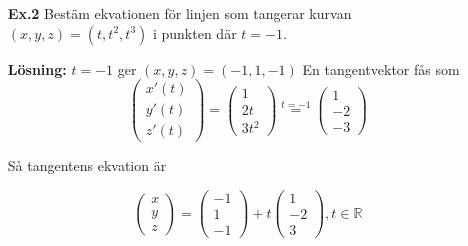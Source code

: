 \documentclass[a4paper,12pt]{article}
\begin{document}
\begin{itemize}
\item[\textbf{Ex.2}]
  Bestäm ekvationen för linjen som tangerar kurvan $(x,y,z) = (t, t^2, t^3)$ i
  punkten där $t = -1$.

  \textbf{Lösning:} $t = -1$ ger $(x,y,z) = (-1,1,-1)$ En tangentvektor fås som
  \begin{equation*}
    \begin{pmatrix}
      x'(t)\\
      y'(t)\\
      z'(t)
    \end{pmatrix}
    =
    \begin{pmatrix}
      1 \\
      2t \\
      3t^2
    \end{pmatrix}
    \stackrel{t = -1}{=}
    \begin{pmatrix}
      1 \\
      -2 \\
      -3
    \end{pmatrix}
  \end{equation*}

  Så tangentens ekvation är

  \begin{equation*}
    \begin{pmatrix}
      x \\
      y \\
      z
    \end{pmatrix}
    =
    \begin{pmatrix}
      -1 \\
      1 \\
      -1
    \end{pmatrix}
    + t
    \begin{pmatrix}
      1 \\
      -2 \\
      3
    \end{pmatrix}, t \in \mathbb{R}
  \end{equation*}
\end{itemize}
\end{document}
